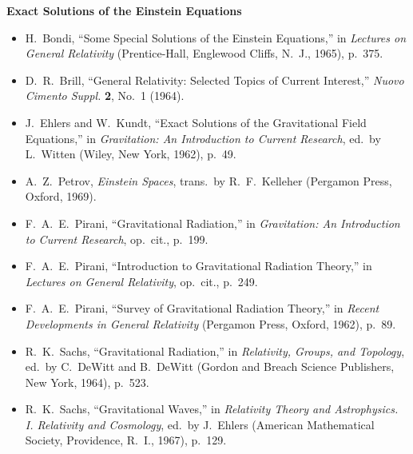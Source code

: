 \medskip
\noindent\textbf{Exact Solutions of the Einstein Equations}\par
\begin{itemize}
  \item[\(\square\)] H.~Bondi, ``Some Special Solutions of the Einstein
  Equations,'' in \emph{Lectures on General Relativity} (Prentice-Hall,
  Englewood Cliffs, N.~J., 1965), p.~375.

  \item[\(\square\)] D.~R.~Brill, ``General Relativity: Selected Topics of
  Current Interest,'' \emph{Nuovo Cimento Suppl.} \textbf{2}, No.~1 (1964).

  \item[\(\square\)] J.~Ehlers and W.~Kundt, ``Exact Solutions of the
  Gravitational Field Equations,'' in \emph{Gravitation: An Introduction to
  Current Research}, ed.\ by L.~Witten (Wiley, New York, 1962), p.~49.

  \item[\(\square\)] A.~Z.~Petrov, \emph{Einstein Spaces}, trans.\ by
  R.~F.~Kelleher (Pergamon Press, Oxford, 1969).

  \item[\(\square\)] F.~A.~E.~Pirani, ``Gravitational Radiation,'' in
  \emph{Gravitation: An Introduction to Current Research}, op.\ cit.,
  p.~199.

  \item[\(\square\)] F.~A.~E.~Pirani, ``Introduction to Gravitational
  Radiation Theory,'' in \emph{Lectures on General Relativity}, op.\ cit.,
  p.~249.

  \item[\(\square\)] F.~A.~E.~Pirani, ``Survey of Gravitational Radiation
  Theory,'' in \emph{Recent Developments in General Relativity} (Pergamon
  Press, Oxford, 1962), p.~89.

  \item[\(\square\)] R.~K.~Sachs, ``Gravitational Radiation,'' in
  \emph{Relativity, Groups, and Topology}, ed.\ by C.~DeWitt and B.~DeWitt
  (Gordon and Breach Science Publishers, New York, 1964), p.~523.

  \item[\(\square\)] R.~K.~Sachs, ``Gravitational Waves,'' in
  \emph{Relativity Theory and Astrophysics. I. Relativity and Cosmology},
  ed.\ by J.~Ehlers (American Mathematical Society, Providence, R.~I.,
  1967), p.~129.
\end{itemize}

